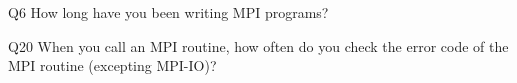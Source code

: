 \begin{description}%
\item{Q6} How long have you been writing MPI programs?%
\item{Q20} When you call an MPI routine, how often do you check the error code of the MPI routine  (excepting MPI-IO)?%
\end{description}%
